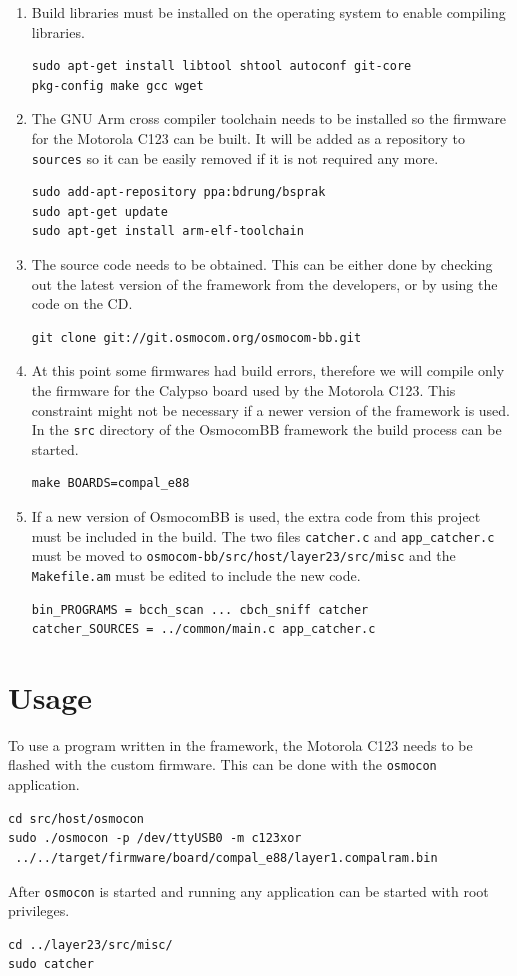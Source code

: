 \begin{enumerate}
	\item Build libraries must be installed on the operating system to enable compiling libraries.
	\begin{lstlisting}
sudo apt-get install libtool shtool autoconf git-core 
pkg-config make gcc wget
	\end{lstlisting}
	\item The GNU Arm cross compiler toolchain needs to be installed so the firmware for the Motorola C123 can be built.
	It will be added as a repository to \texttt{sources} so it can be easily removed if it is not required any more.
	\begin{lstlisting}
sudo add-apt-repository ppa:bdrung/bsprak
sudo apt-get update
sudo apt-get install arm-elf-toolchain
	\end{lstlisting}
	\item The source code needs to be obtained.
	This can be either done by checking out the latest version of the framework from the developers, or by using the code on the CD.
	\begin{lstlisting}
git clone git://git.osmocom.org/osmocom-bb.git
	\end{lstlisting}
	\item At this point some firmwares had build errors, therefore we will compile only the firmware for the Calypso board used by the Motorola C123.
	This constraint might not be necessary if a newer version of the framework is used.
	In the \texttt{src} directory of the OsmocomBB framework the build process can be started.
	\begin{lstlisting}
make BOARDS=compal_e88
	\end{lstlisting}
	\item If a new version of OsmocomBB is used, the extra code from this project must be included in the build.
	The two files \texttt{catcher.c} and \texttt{app\_catcher.c} must be moved to \texttt{osmocom-bb/src/host/layer23/src/misc} and the \texttt{Makefile.am} must be edited to include the new code.
	\begin{lstlisting}
bin_PROGRAMS = bcch_scan ... cbch_sniff catcher
catcher_SOURCES = ../common/main.c app_catcher.c
	\end{lstlisting}
\end{enumerate}

\section{Usage}
\label{sec:osmo_usage}
To use a program written in the framework, the Motorola C123 needs to be flashed with the custom firmware.
This can be done with the \texttt{osmocon} application. 
\begin{lstlisting}
cd src/host/osmocon
sudo ./osmocon -p /dev/ttyUSB0 -m c123xor
 ../../target/firmware/board/compal_e88/layer1.compalram.bin
\end{lstlisting}
After \texttt{osmocon} is started and running any application can be started with root privileges.
\begin{lstlisting}
cd ../layer23/src/misc/
sudo catcher
\end{lstlisting}
\newpage
